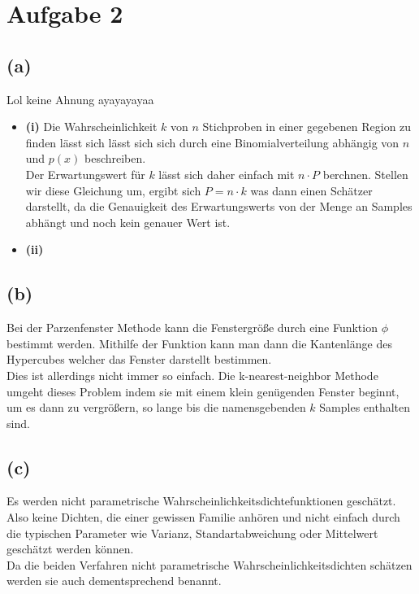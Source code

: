 \documentclass[a4paper]{scrartcl}
\begin{document}
\section*{Aufgabe 2}
\subsection*{(a)}
Lol keine Ahnung ayayayayaa
\begin{itemize}
	\item \textbf{(i)} Die Wahrscheinlichkeit $k$ von $n$ Stichproben in einer gegebenen Region zu finden lässt sich lässt sich sich durch eine Binomialverteilung abhängig von $n$ und $p(x)$ beschreiben.\\
	Der Erwartungswert für $k$ lässt sich daher einfach mit $n \cdot P$ berchnen. Stellen wir diese Gleichung um, ergibt sich $P = n \cdot k$ was dann einen Schätzer darstellt, da die Genauigkeit des Erwartungswerts von der Menge an Samples abhängt und noch kein genauer Wert ist.
	
	\item \textbf{(ii)} 
	
\end{itemize}




\subsection*{(b)}
Bei der Parzenfenster Methode kann die Fenstergröße durch eine Funktion $\phi$ bestimmt werden. Mithilfe der Funktion kann man dann die Kantenlänge des Hypercubes welcher das Fenster darstellt bestimmen.\\
Dies ist allerdings nicht immer so einfach. Die k-nearest-neighbor Methode umgeht dieses Problem indem sie mit einem klein genügenden Fenster beginnt, um es dann zu vergrößern, so lange bis die namensgebenden $k$ Samples enthalten sind.


\subsection*{(c)}
Es werden nicht parametrische Wahrscheinlichkeitsdichtefunktionen geschätzt. Also keine Dichten, die einer gewissen Familie anhören und nicht einfach durch die typischen Parameter wie Varianz, Standartabweichung oder Mittelwert geschätzt werden können.\\
Da die beiden Verfahren nicht parametrische Wahrscheinlichkeitsdichten schätzen werden sie auch dementsprechend benannt.
\end{document}
